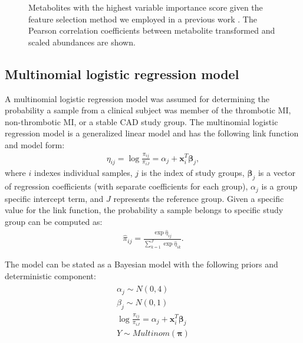 \begin{figure}[H]
	\caption[Correlation plot showing the metabolites that were considered in Bayesian multinomial logistic regression models]{\DoubleSpacing Metabolites with the highest variable importance score given the feature selection method we employed in a previous work \cite{trainor2018}. The Pearson correlation coefficients between metabolite transformed and scaled abundances are shown. \label{fig:include}}
\end{figure}

\begin{DoubleSpace*}
\section{Multinomial logistic regression model}
A multinomial logistic regression model was assumed for determining the  probability a sample from a clinical subject was member of the thrombotic MI, non-thrombotic MI, or a stable CAD study group. The multinomial logistic regression model is a generalized linear model and has the following link function and model form: 
\begin{align}
\eta_{ij} = \log \frac{\pi_{ij}}{\pi_{iJ}} = \alpha_j + \textbf{x}_i^T \boldsymbol{\beta}_j,
\end{align} 
where $i$ indexes individual samples, $j$ is the index of study groups, $\boldsymbol{\beta}_j$ is a vector of regression coefficients (with separate coefficients for each group), $\alpha_j$ is a group specific intercept term, and $J$ represents the reference group. Given a specific value for the link function, the probability a sample belongs to specific study group can be computed as:
\begin{align}
\hat{\pi}_{ij} = \frac{\exp \hat{\eta}_{ij}}{\sum_{k=1}^{J}\exp \hat{\eta}_{ik}}.
\end{align}

The model can be stated as a Bayesian model with the following priors and deterministic component:
\begin{align}
\begin{split}
	\alpha_j \sim N(0,4) \\
	\beta_j \sim N(0,1) \\
	\log \frac{\pi_{ij}}{\pi_{iJ}} = \alpha_j + \textbf{x}_i^T \boldsymbol{\beta}_j \\
	Y \sim Multinom(\boldsymbol{\pi})
\end{split}
\end{align}


\end{DoubleSpace*}
